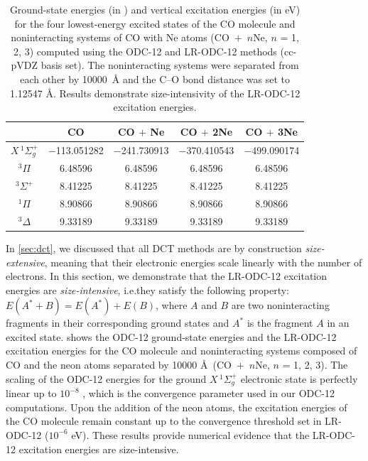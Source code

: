 \begin{table}[h!]
    \centering
    \caption{%
        \label{tab:size_int}
        Ground-state energies (in \hartree) and vertical excitation energies (in
        eV) for the four lowest-energy excited states of the CO molecule and
        noninteracting systems of CO with Ne atoms (\mbox{CO $+$ $n$Ne}, $n$ =
        1, 2, 3) computed using the ODC-12 and LR-ODC-12 methods (cc-pVDZ basis
        set).
        The noninteracting systems were separated from each other by \mbox{10000
        \AA} and the C--O bond distance was set to 1.12547 \AA\@.
        Results demonstrate size-intensivity of the LR-ODC-12 excitation
        energies.
    }
    \begin{tabular}{ccccc}
        \hline
        \hline
        & CO & CO $+$ Ne & CO $+$ 2Ne & CO $+$ 3Ne \\
        \hline
        \({X}\,^1\Sigma_g^+\) & $-$113.051282 & $-$241.730913 & $-$370.410543 & $-$499.090174\\
        \({}^3\Pi\) & 6.48596 & 6.48596 & 6.48596 & 6.48596 \\
        \({}^3\Sigma^+\) & 8.41225 & 8.41225 & 8.41225 & 8.41225 \\
        \({}^1\Pi\) & 8.90866 & 8.90866 & 8.90866 & 8.90866 \\
        \({}^3\Delta\) & 9.33189 & 9.33189 & 9.33189 & 9.33189 \\
        \hline
        \hline
    \end{tabular}
\end{table}

In \cref{sec:dct}, we discussed that all DCT methods are by construction {\it size-extensive}, meaning that their electronic energies scale linearly with the number of electrons.
In this section, we demonstrate that the LR-ODC-12 excitation energies are {\it
size-intensive}, i.e.\@ they satisfy the following property: $E(A^*+B) = E(A^*)
+ E(B)$, where $A$ and $B$ are two noninteracting fragments in their
corresponding ground states and $A^*$ is the fragment $A$ in an excited state.
 shows the ODC-12 ground-state energies and the LR-ODC-12
excitation energies for the CO molecule and noninteracting systems composed of
CO and the neon atoms separated by 10000 \AA\ (\mbox{CO $+$ $n$Ne}, $n$ = 1, 2,
3).
The scaling of the ODC-12 energies for the ground \({X}\,^1\Sigma_g^+\)
electronic state is perfectly linear up to $10^{-8}$ \hartree, which is the
convergence parameter used in our ODC-12 computations.
Upon the addition of the neon atoms, the excitation energies of the CO molecule
remain constant up to the convergence threshold set in LR-ODC-12 ($10^{-6}$
eV).
These results provide numerical evidence that the LR-ODC-12 excitation energies
are size-intensive.


